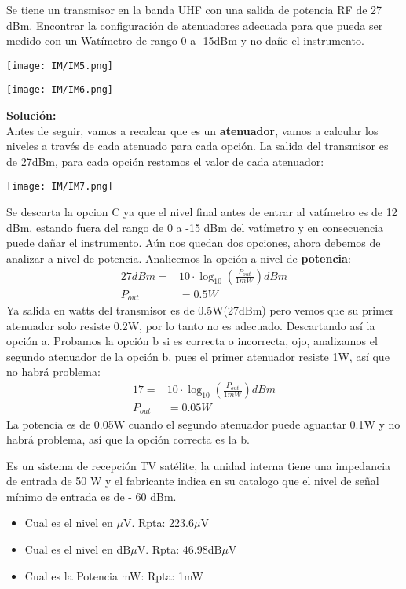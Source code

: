 \documentclass[
	12pt, %
	fleqn, %
	a4paper, %
	oneside, %
]{LegrandOrangeBook}
\begin{document}
\begin{example}[Atenuadores]
Se tiene un transmisor en la banda UHF con una salida de potencia RF de 27 dBm. Encontrar la configuración de atenuadores adecuada para que
pueda ser medido con un Watímetro de rango 0 a -15dBm y no dañe el instrumento.\\
\begin{center}
\texttt{[image: IM/IM5.png]}
\end{center}
\begin{center}
\texttt{[image: IM/IM6.png]}
\end{center}
\textbf{Solución:}\\
Antes de seguir, vamos a recalcar que es un \textbf{atenuador}, vamos a calcular los niveles a través de cada atenuado para cada opción. La salida del transmisor es de 27dBm, para cada opción restamos el valor de cada atenuador:
\begin{center}
\texttt{[image: IM/IM7.png]}
\end{center}
Se descarta la opcion C ya que el nivel final antes de entrar al vatímetro es de 12 dBm, estando fuera del rango de 0 a -15 dBm del vatímetro y en consecuencia puede dañar el instrumento. Aún nos quedan dos opciones, ahora debemos de analizar a nivel de potencia. Analicemos la opción a nivel de \textbf{potencia}:
\begin{align*}
27dBm=&10\cdot \log_{10}\left(\frac{P_{out}}{1mW}\right)dBm\\
P_{out}&=0.5W
\end{align*}
Ya salida en watts del transmisor es de 0.5W(27dBm) pero vemos que su primer atenuador solo resiste 0.2W, por lo tanto no es adecuado. Descartando así la opción a. Probamos la opción b si es correcta o incorrecta, ojo, analizamos el segundo atenuador de la opción b, pues el primer atenuador resiste 1W, así que no habrá problema:
\begin{align*}
17=&10\cdot \log_{10}\left(\frac{P_{out}}{1mW}\right)dBm\\
P_{out}&=0.05W
\end{align*}
La potencia es de 0.05W cuando el segundo atenuador puede aguantar 0.1W y no habrá problema, así que la opción correcta es la b.
\end{example}
\begin{exercise}
Es un sistema de recepción TV satélite, la unidad interna tiene una impedancia de entrada de 50 W y el fabricante indica en su catalogo que
el nivel de señal mínimo de entrada es de - 60 dBm.
\begin{itemize}
\item Cual es el nivel en $\mu$V. Rpta: 223.6$\mu$V
\item Cual es el nivel en dB$\mu$V. Rpta: 46.98dB$\mu$V
\item Cual es la Potencia mW: Rpta: 1mW
\end{itemize}
\end{exercise}
\end{document}
